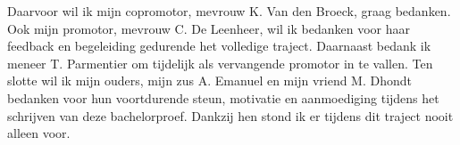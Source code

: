 \vspace{1em}

Daarvoor wil ik mijn copromotor, mevrouw K. Van den Broeck, graag bedanken. Ook mijn promotor, mevrouw C. De Leenheer, wil ik bedanken voor haar feedback en begeleiding gedurende het volledige traject. Daarnaast bedank ik meneer T. Parmentier om tijdelijk als vervangende promotor in te vallen. Ten slotte wil ik mijn ouders, mijn zus A. Emanuel en mijn vriend M. Dhondt bedanken voor hun voortdurende steun, motivatie en aanmoediging tijdens het schrijven van deze bachelorproef. Dankzij hen stond ik er tijdens dit traject nooit alleen voor.